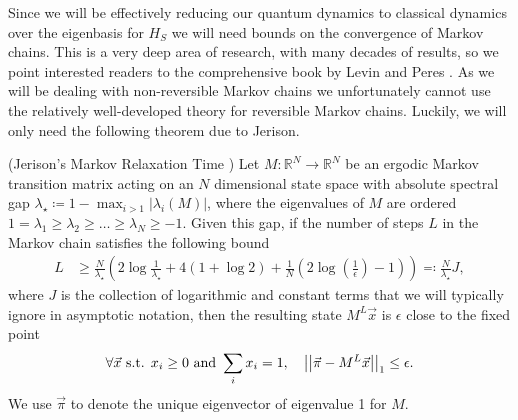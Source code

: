 Since we will be effectively reducing our quantum dynamics to classical dynamics over the eigenbasis for $H_S$ we will need bounds on the convergence of Markov chains. This is a very deep area of research, with many decades of results, so we point interested readers to the comprehensive book by Levin and Peres \cite{levin2017markov}. As we will be dealing with non-reversible Markov chains we unfortunately cannot use the relatively well-developed theory for reversible Markov chains. Luckily, we will only need the following theorem due to Jerison.
\begin{theorem}(Jerison's Markov Relaxation Time \cite{jerison2013general}) \label{thm:markov_chain_bound}
    Let $M : \mathbb{R}^{N} \to  \mathbb{R}^{N}$ be an ergodic Markov transition matrix acting on an $N$ dimensional state space with absolute spectral gap $\lambda_{\star} \coloneqq 1 - \max_{i > 1} |\lambda_i(M)|$, where the eigenvalues of $M$ are ordered $1 = \lambda_1 \ge \lambda_2 \ge \ldots \ge \lambda_N \geq -1$. Given this gap, if the number of steps $L$ in the Markov chain satisfies the following bound
    \begin{align}
        L &\ge \frac{N}{\lambda_{\star}} \left( 2\log \frac{1}{\lambda_{\star}} + 4(1 + \log 2) +  \frac{1}{N} (2 \log \left( \frac{1}{\epsilon} \right) - 1) \right) \eqqcolon \frac{N}{\lambda_\star} J,
    \end{align}
    where $J$ is the collection of logarithmic and constant terms that we will typically ignore in asymptotic notation, then the resulting state $M^L \vec{x}$ is $\epsilon$ close to the fixed point
    \begin{equation}
        \forall \vec{x} \text{ s.t. } x_i \ge 0 \text{ and } \sum_i x_i = 1, \quad \left| \left| \vec{\pi} - M^L \vec{x} \right| \right|_1 \le \epsilon.
    \end{equation}
    We use $\vec{\pi}$ to denote the unique eigenvector of eigenvalue 1 for $M$.
\end{theorem}

